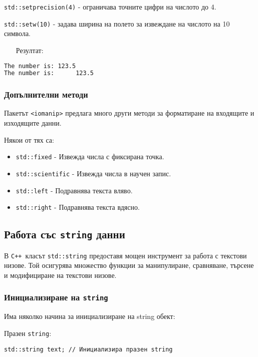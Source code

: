 \documentclass[oneside]{book}
\newcommand*{\code}[1]{\texttt{#1}}
\newcommand*{\cpp}{\texttt{C++}\ }
\begin{document}
\code{std::setprecision(4)} - ограничава точните цифри на числото до 4.

\code{std::setw(10)} - задава ширина на полето за извеждане на числото на 10 символа.

\begin{itemize}
    \item[Резултат:]
\end{itemize} 
\vspace{-4pt}\begin{mdframed}\begin{lstlisting}[language=bash]
The number is: 123.5
The number is:      123.5
\end{lstlisting}\end{mdframed}

\subsubsection{Допълнителни методи}
Пакетът \code{<iomanip>} предлага много други методи за форматиране на входящите и изходящите данни.

Някои от тях са:
\begin{itemize}
    \item \code{std::fixed} - Извежда числа с фиксирана точка.
    \item \code{std::scientific} - Извежда числа в научен запис.
    \item \code{std::left} - Подравнява текста вляво.
    \item \code{std::right} - Подравнява текста вдясно.
\end{itemize}

\subsection{Работа със \code{string} данни}
В \cpp класът \code{std::string} предоставя мощен инструмент за работа с текстови низове. Той осигурява множество функции за манипулиране, сравняване, търсене и модифициране на текстови низове.

\subsubsection{Инициализиране на \code{string}}
Има няколко начина за инициализиране на string обект:

Празен \code{string}:
\begin{mdframed}\begin{lstlisting}
std::string text; // Инициализира празен string
\end{lstlisting}\end{mdframed}
\end{document}
